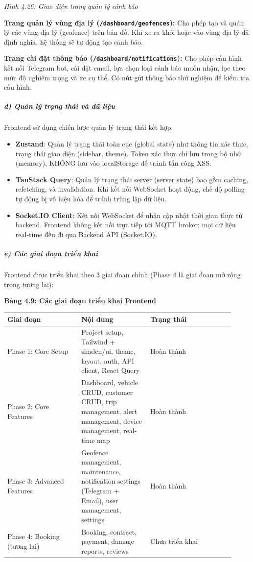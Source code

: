 \documentclass[13pt,a4paper]{extarticle}
\newcounter{none} %
\newcommand{\thesislongtableorignewline}{}
\let\thesislongtableorignewline\\
\renewcommand{\\}{\thesislongtableorignewline\hline}%
\let\\\thesislongtableorignewline
\newcommand{\thesisfigurecaption}[1]{%
  \begin{center}\emph{#1}\end{center}%
}
\newcommand{\thesistabletitle}[1]{%
  \begin{center}\textbf{#1}\end{center}%
}
\providecommand{\tightlist}{%
  \setlength{\itemsep}{0pt}\setlength{\parskip}{0pt}}
\begin{document}
\thesisfigurecaption{Hình 4.26: Giao diện trang quản lý cảnh báo}

\textbf{Trang quản lý vùng địa lý (\texttt{/dashboard/geofences}):} Cho
phép tạo và quản lý các vùng địa lý (geofence) trên bản đồ. Khi xe ra
khỏi hoặc vào vùng địa lý đã định nghĩa, hệ thống sẽ tự động tạo cảnh
báo.

\textbf{Trang cài đặt thông báo (\texttt{/dashboard/notifications}):}
Cho phép cấu hình kết nối Telegram bot, cài đặt email, lựa chọn loại
cảnh báo muốn nhận, lọc theo mức độ nghiêm trọng và xe cụ thể. Có nút
gửi thông báo thử nghiệm để kiểm tra cấu hình.

\subparagraph{d) Quản lý trạng thái và dữ
liệu}\label{d-quux1ea3n-luxfd-trux1ea1ng-thuxe1i-vuxe0-dux1eef-liux1ec7u}

Frontend sử dụng chiến lược quản lý trạng thái kết hợp:

\begin{itemize}
\tightlist
\item
  \textbf{Zustand}: Quản lý trạng thái toàn cục (global state) như thông
  tin xác thực, trạng thái giao diện (sidebar, theme). Token xác thực
  chỉ lưu trong bộ nhớ (memory), KHÔNG lưu vào localStorage để tránh tấn
  công XSS.
\item
  \textbf{TanStack Query}: Quản lý trạng thái server (server state) bao
  gồm caching, refetching, và invalidation. Khi kết nối WebSocket hoạt
  động, chế độ polling tự động bị vô hiệu hóa để tránh trùng lặp dữ
  liệu.
\item
  \textbf{Socket.IO Client}: Kết nối WebSocket để nhận cập nhật thời
  gian thực từ backend. Frontend không kết nối trực tiếp tới MQTT
  broker; mọi dữ liệu real-time đều đi qua Backend API (Socket.IO).
\end{itemize}

\subparagraph{e) Các giai đoạn triển
khai}\label{e-cuxe1c-giai-ux111oux1ea1n-triux1ec3n-khai}

Frontend được triển khai theo 3 giai đoạn chính (Phase 4 là giai đoạn mở
rộng trong tương lai):

\thesistabletitle{Bảng 4.9: Các giai đoạn triển khai Frontend}

{\def\LTcaptype{none} %
\begin{longtable}{|p{0.30\linewidth}|p{0.28\linewidth}|p{0.34\linewidth}|}
\hline \textbf{Giai đoạn} & \textbf{Nội dung} & \textbf{Trạng thái} \\
\hline
\endhead
\hline
\endlastfoot
Phase 1: Core Setup & Project setup, Tailwind + shadcn/ui, theme,
layout, auth, API client, React Query & Hoàn thành \\
Phase 2: Core Features & Dashboard, vehicle CRUD, customer CRUD, trip
management, alert management, device management, real-time map & Hoàn
thành \\
Phase 3: Advanced Features & Geofence management, maintenance,
notification settings (Telegram + Email), user management, settings &
Hoàn thành \\
Phase 4: Booking (tương lai) & Booking, contract, payment, damage
reports, reviews & Chưa triển khai \\
\end{longtable}
}
\end{document}
